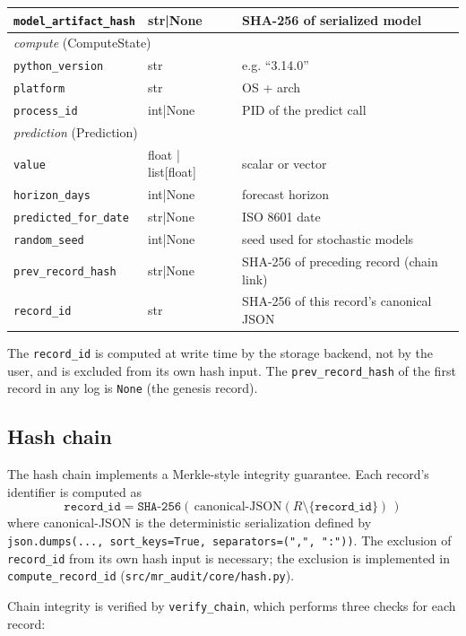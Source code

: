 \begin{table}[H]
\begin{tabular}{@{}p{4.7cm}p{2.6cm}p{7.1cm}@{}}
\quad \texttt{model\_artifact\_hash} & str|None & SHA-256 of serialized model \\
\midrule
\multicolumn{3}{l}{\textit{compute} (ComputeState)} \\
\quad \texttt{python\_version} & str & e.g. ``3.14.0'' \\
\quad \texttt{platform} & str & OS + arch \\
\quad \texttt{process\_id} & int|None & PID of the predict call \\
\midrule
\multicolumn{3}{l}{\textit{prediction} (Prediction)} \\
\quad \texttt{value} & float | list[float] & scalar or vector \\
\quad \texttt{horizon\_days} & int|None & forecast horizon \\
\quad \texttt{predicted\_for\_date} & str|None & ISO 8601 date \\
\midrule
\texttt{random\_seed} & int|None & seed used for stochastic models \\
\texttt{prev\_record\_hash} & str|None & SHA-256 of preceding record (chain link) \\
\texttt{record\_id} & str & SHA-256 of this record's canonical JSON \\
\bottomrule
\end{tabular}
\end{table}

The \texttt{record\_id} is computed at write time by the storage backend, not by the user, and is excluded from its own hash input. The \texttt{prev\_record\_hash} of the first record in any log is \texttt{None} (the genesis record).

\subsection{Hash chain}\label{sec:hash_chain}

The hash chain implements a Merkle-style integrity guarantee. Each record's identifier is computed as
\[
\texttt{record\_id} = \texttt{SHA-256}(\,\text{canonical-JSON}(R \setminus \{\texttt{record\_id}\})\,)
\]
where canonical-JSON is the deterministic serialization defined by \texttt{json.dumps(..., sort\_keys=True, separators=(",", ":"))}. The exclusion of \texttt{record\_id} from its own hash input is necessary; the exclusion is implemented in \texttt{compute\_record\_id} (\texttt{src/mr\_audit/core/hash.py}).

Chain integrity is verified by \texttt{verify\_chain}, which performs three checks for each record:

